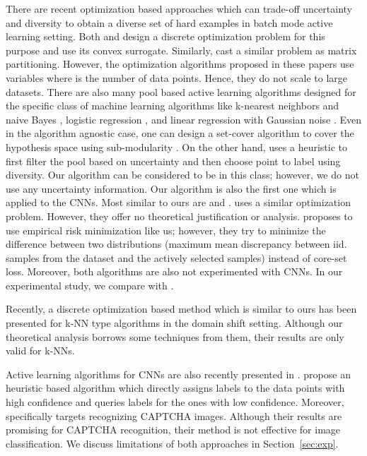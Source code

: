 \documentclass{article} \usepackage{iclr2018_conference,times}
\begin{document}
There are recent optimization based approaches which can trade-off uncertainty
and diversity to obtain a diverse set of hard examples in batch mode active learning setting. Both
\citet{elhamifar2013convex} and \citet{yang2015multi} design a discrete optimization problem for this
purpose and use its convex surrogate. Similarly, \citet{guo2010} cast a similar problem as matrix partitioning. However, the optimization algorithms proposed in these papers use 
variables where  is the number of data points. Hence, they do not scale to
large datasets. There are also many pool based active
learning algorithms designed for the specific class of machine learning
algorithms like k-nearest neighbors and naive Bayes \citep{wei2015submodularity}, logistic regression \cite{hoi_et_al, guo_et_al}, and linear regression with Gaussian noise \citep{yu2006active}.
Even in the algorithm agnostic case, one can design a set-cover algorithm to
cover the hypothesis space using sub-modularity \citep{guillory2010interactive,
golovin2011adaptive}. On the other hand, \citet{demir2011batch} uses a heuristic to first filter the pool based on uncertainty and then choose point to label using diversity. Our algorithm can be considered to be in this class;
however, we do not use any uncertainty information. Our algorithm is also the
first one which is applied to the CNNs. Most similar to ours are \citep{porikli} and \citep{kdd13}. \citet{porikli}
uses a similar optimization problem. However, they offer no theoretical
justification or analysis. \citet{kdd13} proposes to use empirical risk minimization like us; however, they try to minimize the difference between two distributions (maximum mean discrepancy between iid. samples from the dataset and the actively selected samples) instead of core-set loss. Moreover, both algorithms are also not experimented with CNNs. In our experimental study, we compare with \citep{kdd13}.

Recently, a discrete optimization based method \citep{BerlindU15} which is
similar to ours has been presented for k-NN type algorithms in the domain shift
setting. Although our theoretical analysis borrows some techniques from them, their results are only valid for k-NNs.

Active learning algorithms for CNNs are also recently presented in
\citep{wang2016cost, captcha}. \citet{wang2016cost} propose an heuristic based algorithm which directly assigns
labels to the data points with high confidence and queries labels for the ones
with low confidence. Moreover, \citet{captcha} specifically targets recognizing CAPTCHA images. Although their results are promising for CAPTCHA recognition, their method is not effective for image classification. We discuss limitations of both approaches in Section~\ref{sec:exp}.
\end{document}
